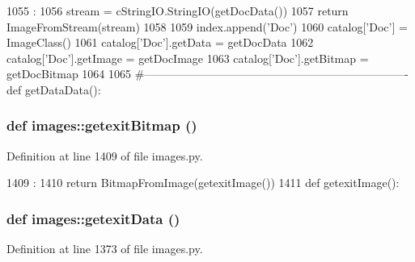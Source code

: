 \begin{DoxyCode}
1055                  :
1056     stream = cStringIO.StringIO(getDocData())
1057     return ImageFromStream(stream)
1058 
1059 index.append('Doc')
1060 catalog['Doc'] = ImageClass()
1061 catalog['Doc'].getData = getDocData
1062 catalog['Doc'].getImage = getDocImage
1063 catalog['Doc'].getBitmap = getDocBitmap
1064 
1065 #----------------------------------------------------------------------
def getDataData():
\end{DoxyCode}
\hypertarget{namespaceimages_ac88a5f50f76c021143a8a756390068ac}{
\subsubsection[{getexitBitmap}]{\setlength{\rightskip}{0pt plus 5cm}def images::getexitBitmap ()}}
\label{namespaceimages_ac88a5f50f76c021143a8a756390068ac}


Definition at line 1409 of file images.py.


\begin{DoxyCode}
1409                    :
1410     return BitmapFromImage(getexitImage())
1411 
def getexitImage():
\end{DoxyCode}
\hypertarget{namespaceimages_a1c7813c8e581d3d6842911ddf0fe5105}{
\subsubsection[{getexitData}]{\setlength{\rightskip}{0pt plus 5cm}def images::getexitData ()}}
\label{namespaceimages_a1c7813c8e581d3d6842911ddf0fe5105}


Definition at line 1373 of file images.py.


